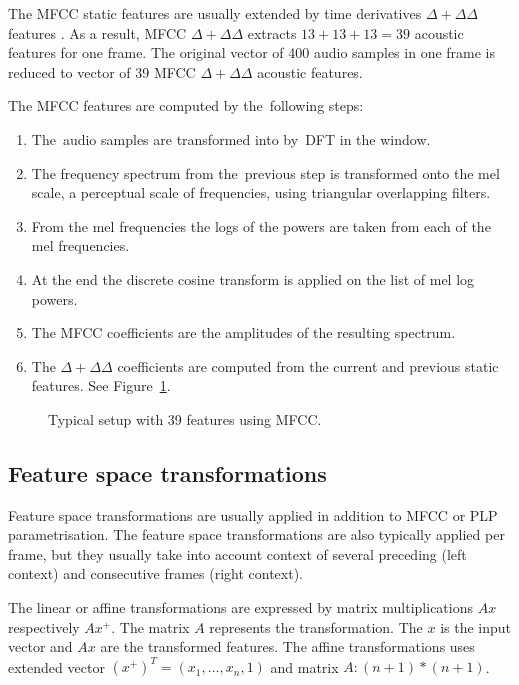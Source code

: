 The \ac{MFCC} static features are usually extended by time derivatives $\Delta+\Delta\Delta$ features \cite{psutka2001comparison}.
As a result, \ac{MFCC} $\Delta+\Delta\Delta$ extracts $13 + 13 + 13 = 39$ acoustic features for one frame. 
The original vector of 400 audio samples in one frame is reduced to vector of 39 \ac{MFCC} $\Delta+\Delta\Delta$ acoustic features.

The \ac{MFCC} features are computed by the~following steps:
\small{\begin{enumerate}
    \item The~audio samples are transformed into  by~\ac{DFT} in the window.
    \item The frequency spectrum from the~previous step is transformed onto the mel scale, a perceptual scale of frequencies, using triangular overlapping filters.
    \item From the mel frequencies the logs of the powers are taken from each of the mel frequencies.
    \item At the end the discrete cosine transform is applied on the list of mel log powers.
    \item The \ac{MFCC} coefficients are the amplitudes of the resulting spectrum.
    \item The $\Delta+\Delta\Delta$ coefficients are computed from the current and previous static features. See Figure~\ref{fig:delta}.
\end{enumerate}}

\begin{figure}
    \begin{center}
    
    \caption{Typical setup with 39 features using \ac{MFCC}.}
    \label{fig:delta} 
    \end{center}
\end{figure}

\subsection*{Feature space transformations}
Feature space transformations are usually applied in addition to \ac{MFCC} or \ac{PLP} parametrisation.
The feature space transformations are also typically applied per frame, but they usually take into account context of several preceding (left context) and consecutive frames (right context).

The linear or affine transformations are expressed by matrix multiplications $Ax$ respectively $Ax^+$.
The matrix $A$ represents the transformation. 
The $x$ is the input vector and $Ax$ are the transformed features.
The affine transformations uses extended vector $(x^+)^T = (x_1, \ldots, x_n, 1)$ and matrix $A: (n+1)*(n+1)$.

